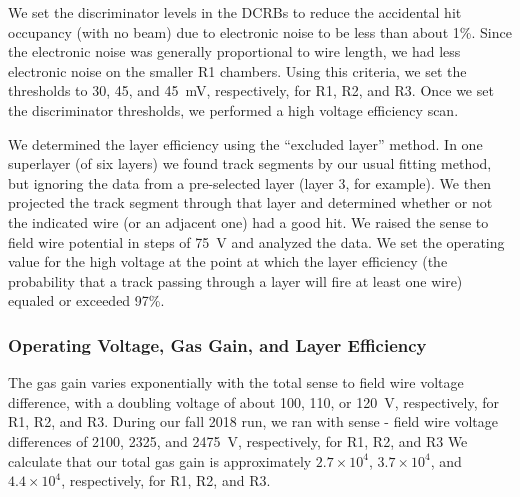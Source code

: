 We set the discriminator levels in the DCRBs to reduce the accidental hit occupancy (with no beam) due to
electronic noise to be less than about 1\%.  Since the electronic noise was generally proportional to wire length,
we had less electronic noise on the smaller R1 chambers.  Using this criteria, we set the thresholds to 30, 45,
and 45~mV, respectively, for R1, R2, and R3.  
Once we set the discriminator thresholds, we performed a high voltage efficiency scan.  

We determined the layer efficiency using the ``excluded layer'' method.  In one superlayer (of six layers) we
found track segments by our usual fitting method, but ignoring the data from a pre-selected layer (layer 3, for
example).  We then projected the track segment through that layer and determined whether or not the indicated
wire (or an adjacent one) had a good hit.
We raised the sense to field wire potential in
steps of 75~V and analyzed the data.  We set the operating value for the high voltage at the point at which
the layer efficiency (the probability that a track passing through a layer will fire at least one wire) equaled or
exceeded 97\%.



\subsubsection{Operating Voltage, Gas Gain, and Layer Efficiency}

The gas gain varies exponentially with the total sense to field wire voltage
difference, with a doubling voltage of about 100, 110, or 120~V, respectively, for
R1, R2, and R3.  During our fall 2018 run, we ran with sense - field wire voltage
differences of 2100, 2325, and 2475~V, respectively, for R1, R2, and R3
We calculate that our total gas gain is approximately 
$2.7 \times 10^4$, $3.7 \times 10^4$, and $4.4 \times 10^4$,  
respectively, for R1, R2, and R3.

